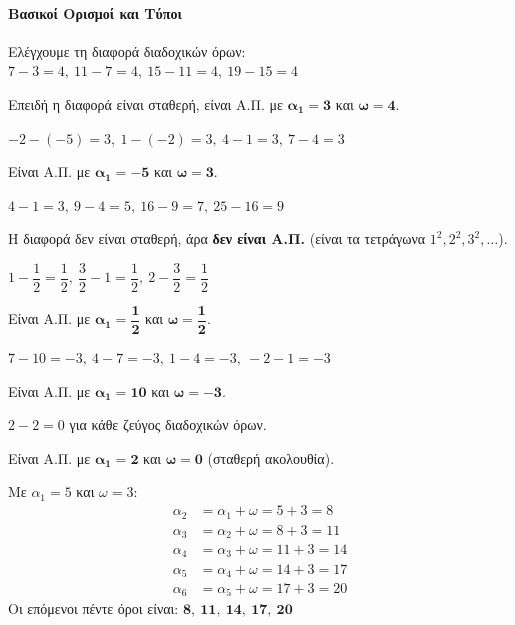 \documentclass[11pt,a4paper,modern]{FFExercises}
\begin{document}

\paragraph{Βασικοί Ορισμοί και Τύποι}

\lysh[1]
\begin{alist}
\item Ελέγχουμε τη διαφορά διαδοχικών όρων:
$7-3=4,\ 11-7=4,\ 15-11=4,\ 19-15=4$

Επειδή η διαφορά είναι σταθερή, είναι Α.Π. με $\boldsymbol{\alpha_1=3}$ και $\boldsymbol{\omega=4}$.

\item $-2-(-5)=3,\ 1-(-2)=3,\ 4-1=3,\ 7-4=3$

Είναι Α.Π. με $\boldsymbol{\alpha_1=-5}$ και $\boldsymbol{\omega=3}$.

\item $4-1=3,\ 9-4=5,\ 16-9=7,\ 25-16=9$

Η διαφορά δεν είναι σταθερή, άρα \textbf{δεν είναι Α.Π.} (είναι τα τετράγωνα $1^2, 2^2, 3^2, \ldots$).

\item $1-\dfrac{1}{2}=\dfrac{1}{2},\ \dfrac{3}{2}-1=\dfrac{1}{2},\ 2-\dfrac{3}{2}=\dfrac{1}{2}$

Είναι Α.Π. με $\boldsymbol{\alpha_1=\dfrac{1}{2}}$ και $\boldsymbol{\omega=\dfrac{1}{2}}$.

\item $7-10=-3,\ 4-7=-3,\ 1-4=-3,\ -2-1=-3$

Είναι Α.Π. με $\boldsymbol{\alpha_1=10}$ και $\boldsymbol{\omega=-3}$.

\item $2-2=0$ για κάθε ζεύγος διαδοχικών όρων.

Είναι Α.Π. με $\boldsymbol{\alpha_1=2}$ και $\boldsymbol{\omega=0}$ (σταθερή ακολουθία).
\end{alist}

\lysh[2]
Με $\alpha_1=5$ και $\omega=3$:
\begin{align*}
\alpha_2&=\alpha_1+\omega=5+3=8\\
\alpha_3&=\alpha_2+\omega=8+3=11\\
\alpha_4&=\alpha_3+\omega=11+3=14\\
\alpha_5&=\alpha_4+\omega=14+3=17\\
\alpha_6&=\alpha_5+\omega=17+3=20
\end{align*}
Οι επόμενοι πέντε όροι είναι: $\boldsymbol{8,\ 11,\ 14,\ 17,\ 20}$
\end{document}
